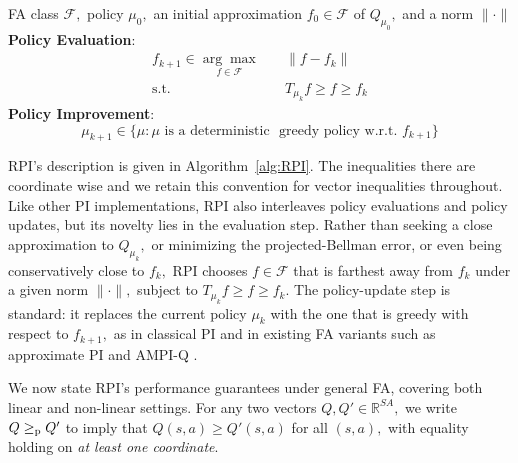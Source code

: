 \documentclass[twoside]{article}
\theoremstyle{plain}
\theoremstyle{definition}
\theoremstyle{remark}
\newcommand{\bR}{\mathbb{R}}
\newcommand{\cF}{\mathcal{F}}
\newcommand{\gep}{\geq_{\textnormal{p}}}
\begin{document}
\begin{algorithm}[t!]
   \caption{Reliable Policy Iteration (RPI)}
   \label{alg:RPI}
\begin{algorithmic}
    FA class $\cF,$ policy $\mu_0,$ an initial approximation $f_0 \in \cF$ of $Q_{\mu_0},$ and a norm $\|\cdot\|$ 
   \STATE \textbf{Policy Evaluation}:
    \begin{equation}
    \label{e:GUIDE.PE.Opt}
        \begin{aligned}
            f_{k+1} \in  \underset{f \in \cF}{\arg\max} \quad & \|f - f_k\| \\
            \text{s.t.} \quad & T_{\mu_k} f  \geq f \geq f_k
        \end{aligned}
    \end{equation}
    \STATE \textbf{Policy Improvement}: 
    \vspace{-1em}
    \begin{equation}
        \mu_{k + 1} \in \{\mu: \mu \text{ is a deterministic } 
        \text{ greedy policy w.r.t. } f_{k + 1} \}
    \end{equation}
    \ENDFOR
\end{algorithmic}
\end{algorithm}

RPI's description is given in Algorithm~\ref{alg:RPI}. The inequalities there are  coordinate wise and we retain this convention for vector inequalities throughout. Like other PI implementations, RPI also interleaves policy evaluations and policy updates, but its novelty lies in the evaluation step. Rather than seeking a close approximation to $Q_{\mu_k},$ or minimizing the projected-Bellman error, or even being conservatively close to $f_k,$ RPI chooses $f \in \cF$ that is farthest away from $f_k$ under a given norm $\|\cdot\|,$ subject to $T_{\mu_k} f \geq f \geq f_k.$ The policy-update step is standard: it replaces the current policy $\mu_k$ with the one that is greedy with respect to $f_{k + 1},$ as in classical PI and in existing FA variants such as approximate PI \citep{bertsekas1996neuro} and AMPI-Q \citep{ampi}. 

% 
We now state RPI's performance guarantees under general FA, covering both linear and non-linear settings. For any two vectors $Q, Q' \in \bR^{SA},$ we write $Q \gep Q'$ to imply that $Q(s, a) \geq Q'(s, a)$ for all $(s, a),$ with equality holding on \textit{at least one coordinate}.
\end{document}

